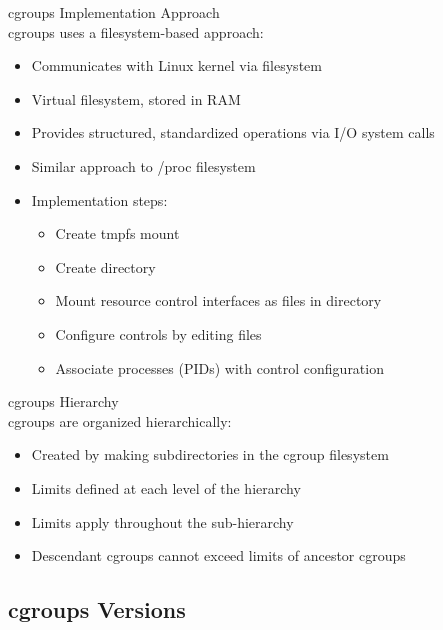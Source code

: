 \begin{definition}{cgroups Implementation Approach}\\
    cgroups uses a filesystem-based approach:
    \begin{itemize}
        \item Communicates with Linux kernel via filesystem
        \item Virtual filesystem, stored in RAM
        \item Provides structured, standardized operations via I/O system calls
        \item Similar approach to /proc filesystem
        \item Implementation steps:
            \begin{itemize}
                \item Create tmpfs mount
                \item Create directory
                \item Mount resource control interfaces as files in directory
                \item Configure controls by editing files
                \item Associate processes (PIDs) with control configuration
            \end{itemize}
    \end{itemize}
\end{definition}

\begin{definition}{cgroups Hierarchy}\\
    cgroups are organized hierarchically:
    \begin{itemize}
        \item Created by making subdirectories in the cgroup filesystem
        \item Limits defined at each level of the hierarchy
        \item Limits apply throughout the sub-hierarchy
        \item Descendant cgroups cannot exceed limits of ancestor cgroups
    \end{itemize}
\end{definition}

\subsection{cgroups Versions}

